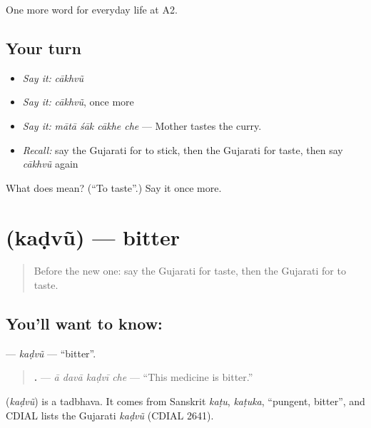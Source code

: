 \begin{grammarlens}[title={What you've built}]
One more word for everyday life at A2.
\end{grammarlens}

\subsection*{Your turn}
\begin{itemize}
\raggedright
  \item \emph{Say it:} \emph{cākhvũ}
  \item \emph{Say it:} \emph{cākhvũ}, once more
  \item \emph{Say it:} \emph{mātā śāk cākhe che} — Mother tastes the curry.
  \item \emph{Recall:} say the Gujarati for to stick, then the Gujarati for taste, then say \emph{cākhvũ} again
\end{itemize}

\begin{tcolorbox}[breakable,colback=teal!4,colframe=teal!35!black,title={Before you move on}]
What does  mean? (\textquotedblleft{}To taste\textquotedblright{}.) Say it once more.
\end{tcolorbox}
\section[\texorpdfstring{\gu{કડવું} (kaḍvũ)}{કડવું (kaḍvũ)}]{ (kaḍvũ) — bitter}

\label{lesson:GU-C171-kadvu}



\begin{quote}
Before the new one: say the Gujarati for taste, then the Gujarati for to taste.
\end{quote}

\subsection*{You'll want to know: }
\textbf{} — \emph{kaḍvũ} — \textquotedblleft{}bitter\textquotedblright{}.

\begin{quote}
\textbf{   .} — \emph{ā davā kaḍvī che} — \textquotedblleft{}This medicine is bitter.\textquotedblright{}
\end{quote}

\begin{cousinweb}
\textbf{} (\emph{kaḍvũ}) is a tadbhava. It comes from Sanskrit \emph{kaṭu}, \emph{kaṭuka}, \textquotedblleft{}pungent, bitter\textquotedblright{}, and CDIAL lists the Gujarati \emph{kaḍvũ} (CDIAL 2641).
\end{cousinweb}

